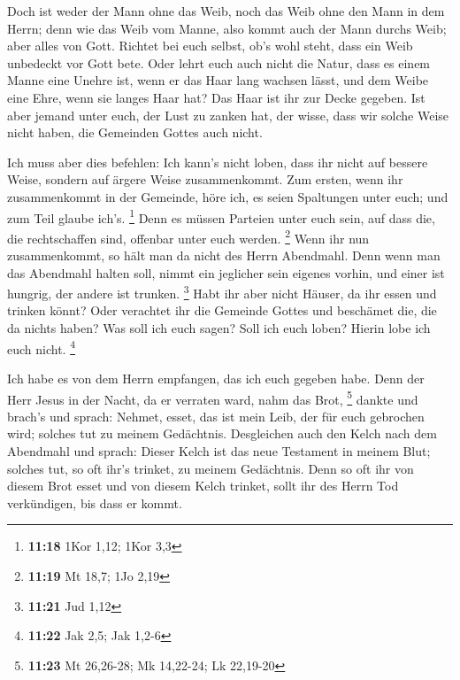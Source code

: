  Doch ist weder der Mann ohne das Weib, noch das Weib
ohne den Mann in dem Herrn;  denn wie das Weib vom Manne,
also kommt auch der Mann durchs Weib; aber alles von Gott.
 Richtet bei euch selbst, ob's wohl steht, dass ein Weib
unbedeckt vor Gott bete.  Oder lehrt euch auch nicht die
Natur, dass es einem Manne eine Unehre ist, wenn er das Haar lang
wachsen lässt,  und dem Weibe eine Ehre, wenn sie langes
Haar hat? Das Haar ist ihr zur Decke gegeben.  Ist aber
jemand unter euch, der Lust zu zanken hat, der wisse, dass wir solche
Weise nicht haben, die Gemeinden Gottes auch nicht.

 Ich muss aber dies befehlen: Ich kann's nicht loben,
dass ihr nicht auf bessere Weise, sondern auf ärgere Weise
zusammenkommt.  Zum ersten, wenn ihr zusammenkommt in der
Gemeinde, höre ich, es seien Spaltungen unter euch; und zum Teil glaube
ich's. \footnote{\textbf{11:18} 1Kor 1,12; 1Kor 3,3} 
Denn es müssen Parteien unter euch sein, auf dass die, die rechtschaffen
sind, offenbar unter euch werden. \footnote{\textbf{11:19} Mt 18,7; 1Jo
  2,19}  Wenn ihr nun zusammenkommt, so hält man da nicht
des Herrn Abendmahl.  Denn wenn man das Abendmahl halten
soll, nimmt ein jeglicher sein eigenes vorhin, und einer ist hungrig,
der andere ist trunken. \footnote{\textbf{11:21} Jud 1,12}
 Habt ihr aber nicht Häuser, da ihr essen und trinken
könnt? Oder verachtet ihr die Gemeinde Gottes und beschämet die, die da
nichts haben? Was soll ich euch sagen? Soll ich euch loben? Hierin lobe
ich euch nicht. \footnote{\textbf{11:22} Jak 2,5; Jak 1,2-6}

 Ich habe es von dem Herrn empfangen, das ich euch
gegeben habe. Denn der Herr Jesus in der Nacht, da er verraten ward,
nahm das Brot, \footnote{\textbf{11:23} Mt 26,26-28; Mk 14,22-24; Lk
  22,19-20}  dankte und brach's und sprach: Nehmet,
esset, das ist mein Leib, der für euch gebrochen wird; solches tut zu
meinem Gedächtnis.  Desgleichen auch den Kelch nach dem
Abendmahl und sprach: Dieser Kelch ist das neue Testament in meinem
Blut; solches tut, so oft ihr's trinket, zu meinem Gedächtnis.
 Denn so oft ihr von diesem Brot esset und von diesem
Kelch trinket, sollt ihr des Herrn Tod verkündigen, bis dass er kommt.

